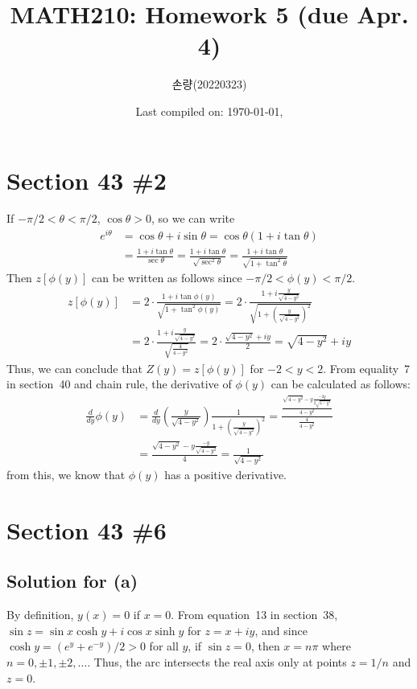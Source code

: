 \documentclass{scrartcl}
\title{MATH210: Homework 5 (due Apr. 4)}
\author{손량(20220323)}
\date{Last compiled on: \today, \currenttime}
\begin{document}
\maketitle

\section{Section 43 \#2}
If \(-\pi / 2 < \theta < \pi / 2\), \(\cos \theta > 0\), so we can write
\begin{align*}
  e^{i\theta} &= \cos \theta + i\sin \theta = \cos \theta \left( 1 + i\tan \theta \right) \\
              &= \frac{ 1 + i\tan \theta}{\sec \theta} = \frac{1 + i\tan \theta}{\sqrt{\sec^2 \theta}}  = \frac{1 + i\tan \theta}{\sqrt{1 + \tan^2 \theta}}
\end{align*}
Then \(z[\phi(y)]\) can be written as follows since \(-\pi / 2 < \phi(y) < \pi / 2\).
\begin{align*}
  z[\phi(y)] &= 2 \cdot \frac{1 + i\tan \phi(y)}{\sqrt{1 + \tan^2 \phi(y)}} = 2 \cdot \frac{1 + i \frac{y}{\sqrt{4 - y^2}}}{\sqrt{1 + \left( \frac{y}{\sqrt{4 - y^2}} \right)^2}} \\
             &= 2 \cdot \frac{1 + i \frac{y}{\sqrt{4 - y^2}}}{\sqrt{\frac{4}{4 - y^2}}} = 2 \cdot \frac{\sqrt{4 - y^2} + iy}{2} = \sqrt{4 - y^2} + iy
\end{align*}
Thus, we can conclude that \(Z(y) = z[\phi(y)]\) for \(-2 < y < 2\).
From equality~7 in section~40 and chain rule, the derivative of \(\phi(y)\) can be calculated as follows:
\begin{align*}
  \frac{d}{dy} \phi(y) &= \frac{d}{dy} \left( \frac{y}{\sqrt{4 - y^2}} \right) \frac{1}{1 + \left( \frac{y}{\sqrt{4 - y^2}} \right)^2} = \frac{\frac{\sqrt{4 - y^2} - y \frac{-2y}{2\sqrt{4 - y^2}}}{4 - y^2}}{\frac{4}{4 - y^2}} \\
                       &= \frac{\sqrt{4 - y^2} - y \frac{-y}{\sqrt{4 - y^2}}}{4} = \frac{1}{\sqrt{4 - y^2}}
\end{align*}
from this, we know that \(\phi(y)\) has a positive derivative.

\section{Section 43 \#6}
\subsection{Solution for (a)}
By definition, \(y(x) = 0\) if \(x = 0\).
From equation~13 in section~38, \(\sin z = \sin x \cosh y + i\cos x \sinh y\) for \(z = x + iy\), and since \(\cosh y = (e^y + e^{-y}) / 2 > 0\) for all \(y\), if \(\sin z = 0\), then \(x = n\pi\) where \(n = 0, \pm 1, \pm 2, \dots\).
Thus, the arc intersects the real axis only at points \(z = 1 / n\) and \(z = 0\).
\end{document}
